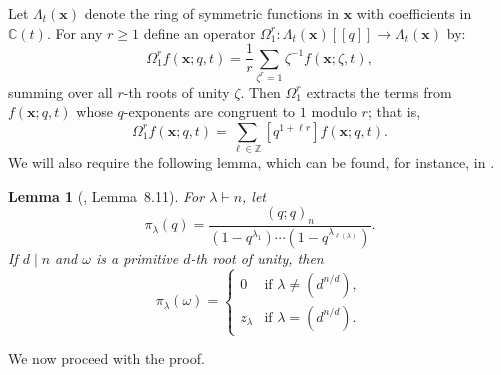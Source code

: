 \documentclass[11pt]{article}
\newtheorem{lemma}[theo]{Lemma}
\theoremstyle{definition}
\numberwithin{equation}{section}
\newcommand\CC{\mathbb{C}}
\newcommand\ZZ{\mathbb{Z}}
\newcommand\xb{\mathbf{x}}
\begin{document}
Let $\Lambda_t(\xb)$ denote the ring of symmetric functions in $\xb$ with coefficients in $\CC(t)$. For any $r \ge 1$ define an operator $\Omega^r_1 : \Lambda_t(\xb)[[q]] \to \Lambda_t(\xb)$ by:
\[
\Omega^r_1f(\xb;q,t) = \frac{1}{r} \sum_{\zeta^r = 1} \zeta^{-1} f(\xb;\zeta,t),
\]
summing over all $r$-th roots of unity $\zeta$. Then $\Omega^r_1$ extracts the terms from $f(\xb;q,t)$ whose $q$-exponents are congruent to $1$ modulo $r$; that is,
\[
\Omega^r_1f(\xb;q,t) = \sum_{\ell \in \ZZ} [q^{1+\ell r}]f(\xb;q,t).
\]
We will also require the following lemma, which can be found, for instance, in \cite{Reu}.
\begin{lemma}[\cite{Reu}, Lemma~8.11]\label{lem:reu}
    For $\lambda \vdash n$, let
    \[
    \pi_\lambda(q) = \frac{(q;q)_n}{(1-q^{\lambda_1}) \cdots (1-q^{\lambda_{\ell(\lambda)}})}.
    \]
    If $d \mid n$ and $\omega$ is a primitive $d$-th root of unity, then
    \[
    \pi_\lambda(\omega) = \begin{cases}
        0 & \text{if } \lambda \neq (d^{n/d}), \\
        z_\lambda & \text{if } \lambda = (d^{n/d}).
    \end{cases}
    \]
\end{lemma}
We now proceed with the proof.
\end{document}

